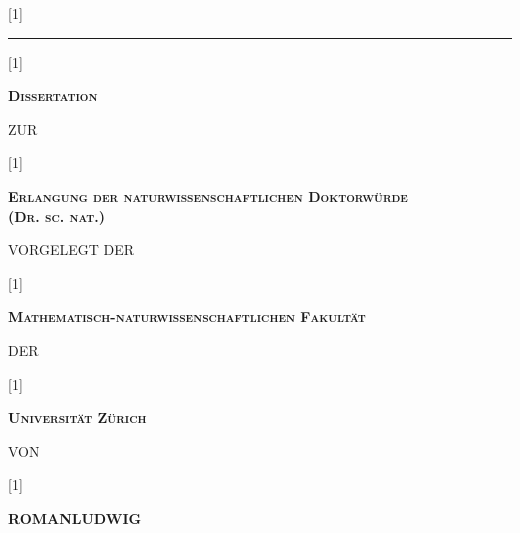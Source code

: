 \documentclass[\relativeRoot/main.tex]{subfiles}
\begin{document}
    \begin{titlepage}
        \begin{center}
            \scalebox{0.7}[1]{\begin{minipage}{1.45\textwidth}
                \centering
                \bfseries
                \scshape
                \huge
                \thetitle
            \end{minipage}} \vspace{5mm}
            
            \rule{2cm}{0.5pt} \vspace{1cm}

            \scalebox{0.8}[1]{\begin{minipage}{\textwidth}
                \centering
                \bfseries
                \scshape
                \Large
                Dissertation
            \end{minipage}} \vfill
            
            {\footnotesize ZUR} \vfill

            \scalebox{0.8}[1]{\begin{minipage}{1.2\textwidth}
                \centering
                \bfseries
                \scshape
                \Large
                Erlangung der naturwissenschaftlichen Doktorwürde\\
                \mdseries
                \large
                (Dr. sc. nat.)
            \end{minipage}}\vfill

            {\footnotesize VORGELEGT DER} \vfill

            \scalebox{0.8}[1]{\begin{minipage}{1.2\textwidth}
                \centering
                \bfseries
                \scshape
                \Large
                Mathematisch-naturwissenschaftlichen Fakultät
            \end{minipage}} \vfill

            {\footnotesize DER} \vfill

            \scalebox{0.8}[1]{\begin{minipage}{1.0\textwidth}
                \centering
                \bfseries
                \scshape
                \Large
                Universität Zürich
            \end{minipage}} \vfill

            {\footnotesize VON} \vfill

            \scalebox{1.2}[1]{\begin{minipage}{0.7\textwidth}
                \centering
                \LARGE
                \bfseries
                \ttfamily
                ROMAN\hspace{2.5mm}LUDWIG
            \end{minipage}} \vfill


\end{center}
\end{titlepage}
\end{document}
